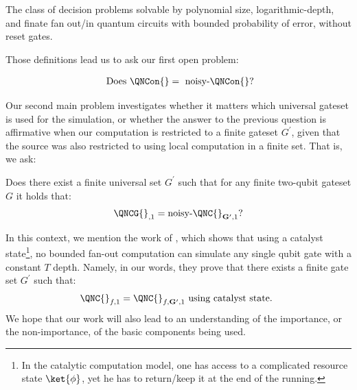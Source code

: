 \begin{definition}
  The class of decision problems solvable by polynomial size,  logarithmic-depth, and finate fan out/in quantum circuits with bounded probability of error, without reset gates.
\end{definition}
Those definitions lead us to ask our first open problem:
\begin{oproblem}
\begin{equation*}
  \begin{split}
    \text{ Does }  \QNCon{} = \text{ noisy-}\QNCon{} \text{?}
  \end{split}
\end{equation*}
\end{oproblem}
Our second main problem investigates whether it matters which universal gateset is used for the simulation, or whether the answer to the previous question is affirmative when our computation is restricted to a finite gateset $G^{\prime}$, given that the source was also restricted to using local computation in a finite set. That is, we ask: \begin{oproblem}
  Does there exist a finite universal set $G^{\prime}$ such that for any finite two-qubit gateset $G$ it holds that:
\begin{equation*}
  \begin{split}
\QNCG{}_{,1} = \text{noisy-}\QNC{}_{\mathbf{G^{\prime}}, 1} \text{?}
  \end{split}
\end{equation*}
\end{oproblem}

In this context, we mention the work of \cite{kim2025catalyticzrotationsconstanttdepth}, which shows that using a catalyst state\footnote{In the catalytic computation model, one has access to a complicated resource state $\ket{\phi}$, yet he has to return/keep it at the end of the running.}, no bounded fan-out computation can simulate any single qubit gate with a constant $T$ depth. Namely, in our words, they prove that there exists a finite gate set $G^{\prime}$ such that:
\begin{equation*}
  \begin{split}
    \QNC{}_{f,1} = \QNC{}_{f, \mathbf{G^{\prime}}, 1} \text{ using catalyst state. }
  \end{split}
\end{equation*}
We hope that our work will also lead to an understanding of the importance, or the non-importance, of the basic components being used.
